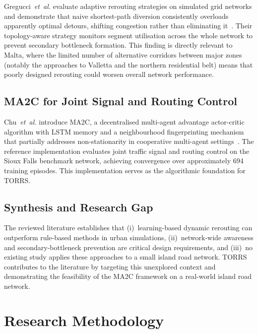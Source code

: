 \documentclass[conference]{IEEEtran}
\begin{document}
Gregucci~\textit{et~al.} evaluate adaptive rerouting strategies on simulated
grid networks and demonstrate that naive shortest-path diversion consistently
overloads apparently optimal detours, shifting congestion rather than
eliminating it~\cite{gregucci2023}. Their topology-aware strategy monitors
segment utilisation across the whole network to prevent secondary bottleneck
formation. This finding is directly relevant to Malta, where the limited number
of alternative corridors between major zones (notably the approaches to Valletta
and the northern residential belt) means that poorly designed rerouting could
worsen overall network performance.

\subsection{MA2C for Joint Signal and Routing Control}

Chu~\textit{et~al.} introduce MA2C, a decentralised multi-agent advantage
actor-critic algorithm with LSTM memory and a neighbourhood fingerprinting
mechanism that partially addresses non-stationarity in cooperative multi-agent
settings~\cite{chu2020}. The reference implementation evaluates joint traffic
signal and routing control on the Sioux Falls benchmark network, achieving
convergence over approximately 694 training episodes. This implementation
serves as the algorithmic foundation for TORRS.

\subsection{Synthesis and Research Gap}

The reviewed literature establishes that (i)~learning-based dynamic rerouting
can outperform rule-based methods in urban simulations, (ii)~network-wide
awareness and secondary-bottleneck prevention are critical design requirements,
and (iii)~no existing study applies these approaches to a small island road
network. TORRS contributes to the literature by targeting this unexplored context
and demonstrating the feasibility of the MA2C framework on a real-world
island road network.

\section{Research Methodology}
\end{document}
